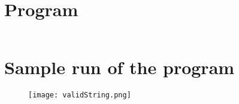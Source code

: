 \documentclass{article}
\begin{document}
 \section*{Program}
\inputminted{c}{validString.c} \newpage
\section*{Sample run of the program} \begin{figure}[H]
\centering
\texttt{[image: validString.png]} \end{figure}
\end{document}
